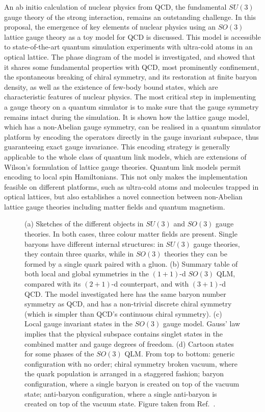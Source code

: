 \documentclass[epj,final]{svjour}
\begin{document}
An ab initio calculation of nuclear physics from QCD, the fundamental $SU(3)$ gauge theory of the strong interaction, remains an outstanding challenge. In this proposal, the emergence of key elements of nuclear physics using an $SO(3)$ lattice gauge theory as a toy model for QCD is discussed. This model is accessible to state-of-the-art quantum simulation experiments with ultra-cold atoms in an optical lattice. The phase diagram of the model is investigated, and showed that it shares some fundamental properties with QCD, most prominently confinement, the spontaneous breaking of chiral symmetry, and its restoration at finite baryon density, as well as the existence of few-body bound states, which are characteristic features of nuclear physics. The most critical step in implementing a gauge theory on a quantum simulator is to make sure that the gauge symmetry remains intact during the simulation. It is shown how the lattice gauge model, which has a non-Abelian gauge symmetry, can be realised in a quantum simulator platform by encoding the operators directly in the gauge invariant subspace, thus guaranteeing exact gauge invariance. This encoding strategy is generally applicable to the whole class of quantum link models, which are extensions of Wilson's formulation of lattice gauge theories. Quantum link models permit encoding to local spin Hamiltonians. This not only makes the implementation feasible on different platforms, such as ultra-cold atoms and molecules trapped in optical lattices, but also establishes a novel connection between non-Abelian lattice gauge theories including matter fields and quantum magnetism.

\begin{figure}[htb]
\begin{center}
\caption{(a) Sketches of the different objects in $SU(3)$ and $SO(3)$ gauge theories. In both cases, three colour matter fields are present. Single baryons have different internal structures: in $SU(3)$ gauge theories, they contain three quarks, while in $SO(3)$ theories they can be formed by a single quark paired with a gluon. (b) Summary table of both local and global symmetries in the $(1+1)$-d $SO(3)$ QLM, compared with its $(2+1)$-d counterpart, and with $(3+1)$-d QCD. The model investigated here has the same baryon number symmetry as QCD, and has a non-trivial discrete chiral symmetry (which is simpler than QCD's continuous chiral symmetry). (c) Local gauge invariant states in the $SO(3)$ gauge model. Gauss' law implies that the physical subspace contains singlet states in the combined matter and gauge degrees of freedom. (d) Cartoon states for some phases of the $SO(3)$ QLM. From top to bottom: generic configuration with no order; chiral symmetry broken vacuum, where the quark population is arranged in a staggered fashion; baryon configuration, where a single baryon is created on top of the vacuum state; anti-baryon configuration, where a single anti-baryon is created on top of the vacuum state. Figure taken from Ref.~\cite{rico2018so}.}
\end{center}
\end{figure}
\end{document}
